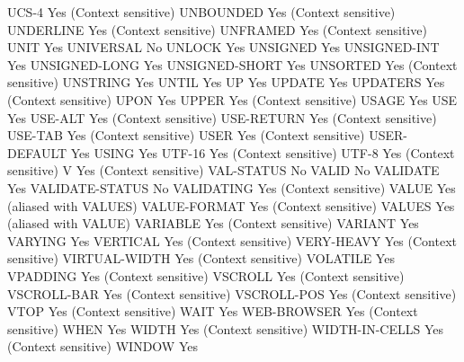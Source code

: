 UCS-4                           Yes (Context sensitive)
UNBOUNDED                       Yes (Context sensitive)
UNDERLINE                       Yes (Context sensitive)
UNFRAMED                        Yes (Context sensitive)
UNIT                            Yes
UNIVERSAL                       No
UNLOCK                          Yes
UNSIGNED                        Yes
UNSIGNED-INT                    Yes
UNSIGNED-LONG                   Yes
UNSIGNED-SHORT                  Yes
UNSORTED                        Yes (Context sensitive)
UNSTRING                        Yes
UNTIL                           Yes
UP                              Yes
UPDATE                          Yes
UPDATERS                        Yes (Context sensitive)
UPON                            Yes
UPPER                           Yes (Context sensitive)
USAGE                           Yes
USE                             Yes
USE-ALT                         Yes (Context sensitive)
USE-RETURN                      Yes (Context sensitive)
USE-TAB                         Yes (Context sensitive)
USER                            Yes (Context sensitive)
USER-DEFAULT                    Yes
USING                           Yes
UTF-16                          Yes (Context sensitive)
UTF-8                           Yes (Context sensitive)
V                               Yes (Context sensitive)
VAL-STATUS                      No
VALID                           No
VALIDATE                        Yes
VALIDATE-STATUS                 No
VALIDATING                      Yes (Context sensitive)
VALUE                           Yes (aliased with VALUES)
VALUE-FORMAT                    Yes (Context sensitive)
VALUES                          Yes (aliased with VALUE)
VARIABLE                        Yes (Context sensitive)
VARIANT                         Yes
VARYING                         Yes
VERTICAL                        Yes (Context sensitive)
VERY-HEAVY                      Yes (Context sensitive)
VIRTUAL-WIDTH                   Yes (Context sensitive)
VOLATILE                        Yes
VPADDING                        Yes (Context sensitive)
VSCROLL                         Yes (Context sensitive)
VSCROLL-BAR                     Yes (Context sensitive)
VSCROLL-POS                     Yes (Context sensitive)
VTOP                            Yes (Context sensitive)
WAIT                            Yes
WEB-BROWSER                     Yes (Context sensitive)
WHEN                            Yes
WIDTH                           Yes (Context sensitive)
WIDTH-IN-CELLS                  Yes (Context sensitive)
WINDOW                          Yes
